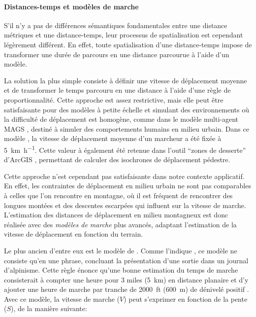 \paragraph{Distances-temps et modèles de marche}



S'il n'y a pas de différences sémantiques fondamentales entre une
distance métriques et une distance-temps, leur processus de
spatialisation est cependant légèrement différent. En effet, toute
spatialisation d'une distance-temps impose de transformer une durée de
parcours en une distance parcourue à l'aide d'un modèle.

La solution la plus simple consiste à définir une vitesse de
déplacement moyenne et de transformer le temps parcouru en une
distance à l'aide d'une règle de proportionnalité. Cette approche est
assez restrictive, mais elle peut être satisfaisante pour des modèles
à petite échelle et simulant des environnements où la difficulté de
déplacement est homogène, comme dans le modèle multi-agent MAGS
\autocite{Moulin2003}, destiné à simuler des comportements humains en
milieu urbain. Dans ce modèle \autocite{Moulin2003}, la vitesse de
déplacement moyenne d'un marcheur a été fixée à
\SI{5}{\kilo\meter\per\hour}. Cette valeur à également été retenue
dans l'outil \enquote{zones de desserte} d'ArcGIS \autocite{ESRI2020},
permettant de calculer des isochrones de déplacement pédestre.

Cette approche n'est cependant pas satisfaisante dans notre contexte
applicatif. En effet, les contraintes de déplacement en milieu urbain
ne sont pas comparables à celles que l'on rencontre en montagne, où il
est fréquent de rencontrer des longues montées et des descentes
escarpées qui influent sur la vitesse de marche. L'estimation des
distances de déplacement en milieu montagneux est donc réalisée avec
des \emph{modèles de marche} plus avancés, adaptant l'estimation de la
vitesse de déplacement en fonction du terrain.

Le plus ancien d'entre eux est le modèle de
\textcite{Naismith1892}. Comme l'indique \textcite{Duchene2019}, ce
modèle ne consiste qu'en une phrase, concluant la présentation d'une
sortie dans un journal d'alpinisme. Cette règle énonce qu'une bonne
estimation du temps de marche consisterait à compter une heure pour 3
miles (\SI{5}{\kilo\meter}) en distance planaire et d'y ajouter une
heure de marche par tranche de \SI{2000}{ft} (\SI{600}{\meter}) de
dénivelé positif \autocite{Naismith1892}. Avec ce modèle, la vitesse
de marche (\(V\)) peut s'exprimer en fonction de la pente (\(S\)), de
la manière suivante:

